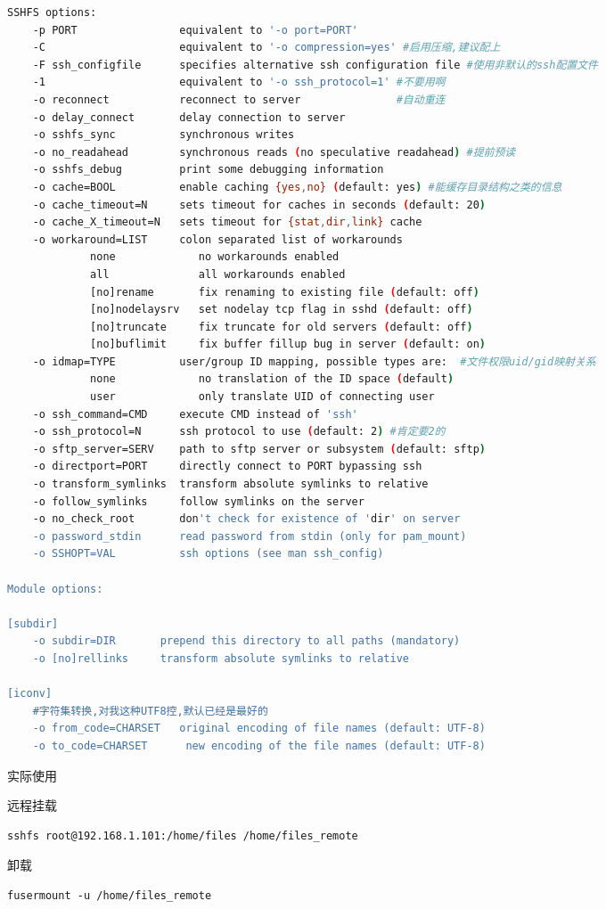\documentclass[12pt,a4paper,landscape]{article}
\begin{document}
\begin{CJK}{UTF8}{gbsn}
\begin{lstlisting}[language=bash]
SSHFS options:
    -p PORT                equivalent to '-o port=PORT'
    -C                     equivalent to '-o compression=yes' #启用压缩,建议配上
    -F ssh_configfile      specifies alternative ssh configuration file #使用非默认的ssh配置文件
    -1                     equivalent to '-o ssh_protocol=1' #不要用啊
    -o reconnect           reconnect to server               #自动重连
    -o delay_connect       delay connection to server
    -o sshfs_sync          synchronous writes
    -o no_readahead        synchronous reads (no speculative readahead) #提前预读
    -o sshfs_debug         print some debugging information
    -o cache=BOOL          enable caching {yes,no} (default: yes) #能缓存目录结构之类的信息
    -o cache_timeout=N     sets timeout for caches in seconds (default: 20)
    -o cache_X_timeout=N   sets timeout for {stat,dir,link} cache
    -o workaround=LIST     colon separated list of workarounds
             none             no workarounds enabled
             all              all workarounds enabled
             [no]rename       fix renaming to existing file (default: off)
             [no]nodelaysrv   set nodelay tcp flag in sshd (default: off)
             [no]truncate     fix truncate for old servers (default: off)
             [no]buflimit     fix buffer fillup bug in server (default: on)
    -o idmap=TYPE          user/group ID mapping, possible types are:  #文件权限uid/gid映射关系
             none             no translation of the ID space (default)
             user             only translate UID of connecting user
    -o ssh_command=CMD     execute CMD instead of 'ssh'
    -o ssh_protocol=N      ssh protocol to use (default: 2) #肯定要2的
    -o sftp_server=SERV    path to sftp server or subsystem (default: sftp)
    -o directport=PORT     directly connect to PORT bypassing ssh
    -o transform_symlinks  transform absolute symlinks to relative
    -o follow_symlinks     follow symlinks on the server
    -o no_check_root       don't check for existence of 'dir' on server
    -o password_stdin      read password from stdin (only for pam_mount)
    -o SSHOPT=VAL          ssh options (see man ssh_config)

Module options:

[subdir]
    -o subdir=DIR       prepend this directory to all paths (mandatory)
    -o [no]rellinks     transform absolute symlinks to relative

[iconv]
    #字符集转换,对我这种UTF8控,默认已经是最好的
    -o from_code=CHARSET   original encoding of file names (default: UTF-8)
    -o to_code=CHARSET      new encoding of the file names (default: UTF-8)
\end{lstlisting}


实际使用

远程挂载

\begin{lstlisting}
sshfs root@192.168.1.101:/home/files /home/files_remote
\end{lstlisting}

卸载
\begin{lstlisting}
fusermount -u /home/files_remote
\end{lstlisting}




\end{CJK}
\end{document}
